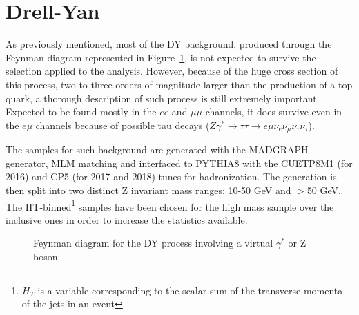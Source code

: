 \documentclass[a4paper, 10pt, openright]{report}
\begin{document}
\section{Drell-Yan} \label{subsection:DY}

As previously mentioned, most of the \ac{DY} background, produced through the Feynman diagram represented in Figure~\ref{fig:DY}, is not expected to survive the selection applied to the analysis. However, because of the huge cross section of this process, two to three orders of magnitude larger than the production of a top quark, a thorough description of such process is still extremely important. Expected to be found mostly in the $ee$ and $\mu \mu$ channels, it does survive even in the $e \mu$ channels because of possible tau decays ($Z \gamma^{*} \rightarrow \tau \tau \rightarrow e \mu \nu_e \nu_\mu \nu_\tau \nu_\tau$). 

The samples for such background are generated with the MADGRAPH generator, MLM matching and interfaced to PYTHIA8 with the CUETP8M1 (for 2016) and CP5 (for 2017 and 2018) tunes for hadronization. The generation is then split into two distinct Z invariant mass ranges: 10-50 GeV and $>$50 GeV. The HT-binned\footnote{$H_T$ is a variable corresponding to the scalar sum of the transverse momenta of the jets in an event} samples have been chosen for the high mass sample over the inclusive ones in order to increase the statistics available.

\begin{figure}[htbp]
\centering
\begin{minipage}[b]{.34\textwidth}
\end{minipage} 
\caption{Feynman diagram for the \ac{DY} process involving a virtual $\gamma^*$ or Z boson.}
\label{fig:DY}
\end{figure}
\end{document}
